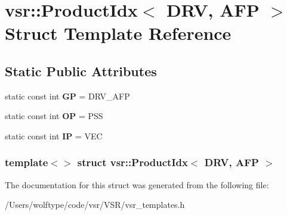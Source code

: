 \hypertarget{structvsr_1_1_product_idx_3_01_d_r_v_00_01_a_f_p_01_4}{\section{vsr\-:\-:Product\-Idx$<$ D\-R\-V, A\-F\-P $>$ Struct Template Reference}
\label{structvsr_1_1_product_idx_3_01_d_r_v_00_01_a_f_p_01_4}
}
\subsection*{Static Public Attributes}
\begin{DoxyCompactItemize}
\item 
\hypertarget{structvsr_1_1_product_idx_3_01_d_r_v_00_01_a_f_p_01_4_acae2b5adda38a7072f40495e6f7b691d}{static const int {\bfseries G\-P} = D\-R\-V\-\_\-\-A\-F\-P}\label{structvsr_1_1_product_idx_3_01_d_r_v_00_01_a_f_p_01_4_acae2b5adda38a7072f40495e6f7b691d}

\item 
\hypertarget{structvsr_1_1_product_idx_3_01_d_r_v_00_01_a_f_p_01_4_a9df81e35e73c44b145d5193b56ae6bf6}{static const int {\bfseries O\-P} = P\-S\-S}\label{structvsr_1_1_product_idx_3_01_d_r_v_00_01_a_f_p_01_4_a9df81e35e73c44b145d5193b56ae6bf6}

\item 
\hypertarget{structvsr_1_1_product_idx_3_01_d_r_v_00_01_a_f_p_01_4_ab4b9d969c40631937c5e7d6b308b8bc6}{static const int {\bfseries I\-P} = V\-E\-C}\label{structvsr_1_1_product_idx_3_01_d_r_v_00_01_a_f_p_01_4_ab4b9d969c40631937c5e7d6b308b8bc6}

\end{DoxyCompactItemize}
\subsubsection*{template$<$$>$ struct vsr\-::\-Product\-Idx$<$ D\-R\-V, A\-F\-P $>$}



The documentation for this struct was generated from the following file\-:\begin{DoxyCompactItemize}
\item 
/\-Users/wolftype/code/vsr/\-V\-S\-R/vsr\-\_\-templates.\-h\end{DoxyCompactItemize}
